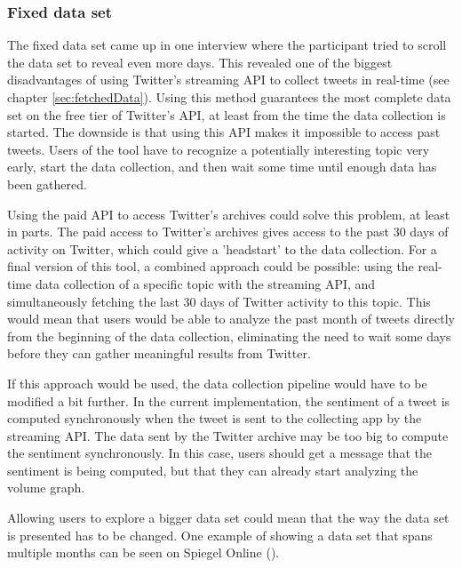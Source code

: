\subsubsection*{Fixed data set}
The fixed data set came up in one interview where the participant tried to scroll the data set to reveal even more days. This revealed one of the biggest disadvantages of using Twitter's streaming API to collect tweets in real-time (see chapter \ref{sec:fetchedData}). Using this method guarantees the most complete data set on the free tier of Twitter's API, at least from the time the data collection is started. The downside is that using this API makes it impossible to access past tweets. Users of the tool have to recognize a potentially interesting topic very early, start the data collection, and then wait some time until enough data has been gathered.

Using the paid API to access Twitter's archives could solve this problem, at least in parts. The paid access to Twitter's archives gives access to the past 30 days of activity on Twitter, which could give a 'headstart' to the data collection. For a final version of this tool, a combined approach could be possible: using the real-time data collection of a specific topic with the streaming API, and simultaneously fetching the last 30 days of Twitter activity to this topic. This would mean that users would be able to analyze the past month of tweets directly from the beginning of the data collection, eliminating the need to wait some days before they can gather meaningful results from Twitter.

If this approach would be used, the data collection pipeline would have to be modified a bit further. In the current implementation, the sentiment of a tweet is computed synchronously when the tweet is sent to the collecting app by the streaming API. The data sent by the Twitter archive may be too big to compute the sentiment synchronously. In this case, users should get a message that the sentiment is being computed, but that they can already start analyzing the volume graph.

Allowing users to explore a bigger data set could mean that the way the data set is presented has to be changed. One example of showing a data set that spans multiple months can be seen on Spiegel Online (\cite{merlotCoronavirusBrasilienManaus2020}).

